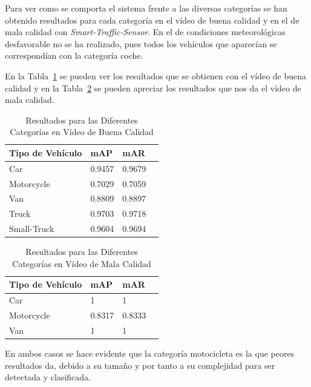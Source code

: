 Para ver como se comporta el sistema frente a las diversas categorías se han obtenido resultados para cada categoría en el vídeo de buena calidad y en el de mala calidad con \textit{Smart-Traffic-Sensor}. En el de condiciones meteorológicas desfavorable no se ha realizado, pues todos los vehículos que aparecían se correspondían con la categoría coche.

En la Tabla~\ref{resultados_categoria_video_buena_calidad} se pueden ver los resultados que se obtienen con el vídeo de buena calidad y en la Tabla~\ref{resultados_categoria_video_mala_calidad} se pueden apreciar los resultados que nos da el vídeo de mala calidad.

\begin{table}[H] 
\begin{center}
\begin{tabular}{|l|l|l|l|}
\hline
Tipo de Vehículo & mAP & mAR  \\ 
\hline \hline
Car & 0.9457 & 0.9679 \\ \hline
Motorcycle & 0.7029 & 0.7059 \\ \hline
Van & 0.8809 & 0.8897\\ \hline
Truck & 0.9703 & 0.9718\\ \hline
Small-Truck & 0.9604 & 0.9694\\ \hline
\end{tabular}
\caption{Resultados para las Diferentes Categorías en Vídeo de Buena Calidad}
\label{resultados_categoria_video_buena_calidad}
\end{center}
\end{table}

\begin{table}[H] 
\begin{center}
\begin{tabular}{|l|l|l|l|}
\hline
Tipo de Vehículo & mAP & mAR  \\ 
\hline \hline
Car & 1 & 1 \\ \hline
Motorcycle & 0.8317 & 0.8333 \\ \hline
Van & 1 & 1 \\ \hline
\end{tabular}
\caption{Resultados para las Diferentes Categorías en Vídeo de Mala Calidad}
\label{resultados_categoria_video_mala_calidad}
\end{center}
\end{table}

En ambos casos se hace evidente que la categoría motocicleta es la que peores resultados da, debido a su tamaño y por tanto a su complejidad para ser detectada y clasificada.

